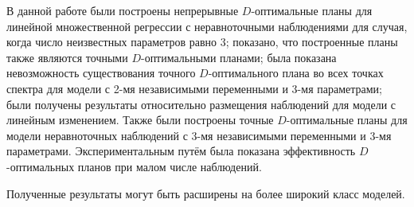 В данной работе были построены непрерывные $D$-оптимальные планы для линейной множественной регрессии с неравноточными наблюдениями для случая, когда число неизвестных параметров равно 3; показано, что построенные планы также являются точными $D$-оптимальными планами; была показана невозможность существования точного $D$-оптимального плана во всех точках спектра для модели с 2-мя независимыми переменными и 3-мя параметрами; были получены результаты относительно размещения наблюдений для модели с линейным изменением. Также были построены точные $D$-оптимальные планы для модели неравноточных наблюдений с 3-мя независимыми переменными и 3-мя параметрами. Экспериментальным путём была показана эффективность $D$-оптимальных планов при малом числе наблюдений.

Полученные результаты могут быть расширены на более широкий класс моделей.